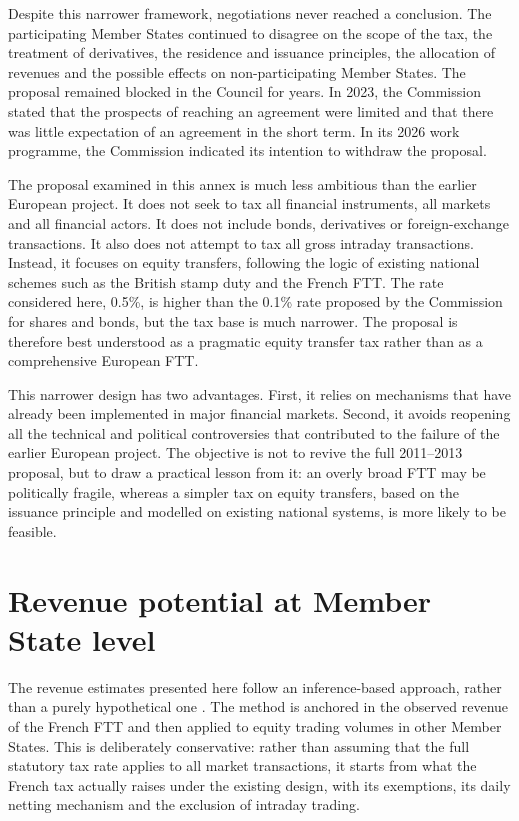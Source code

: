 \documentclass[../../main]{subfiles}
\begin{document}
Despite this narrower framework, negotiations never reached a conclusion. The participating Member States continued to disagree on the scope of the tax, the treatment of derivatives, the residence and issuance principles, the allocation of revenues and the possible effects on non-participating Member States. The proposal remained blocked in the Council for years. In 2023, the Commission stated that the prospects of reaching an agreement were limited and that there was little expectation of an agreement in the short term. In its 2026 work programme, the Commission indicated its intention to withdraw the proposal.

The proposal examined in this annex is much less ambitious than the earlier European project. It does not seek to tax all financial instruments, all markets and all financial actors. It does not include bonds, derivatives or foreign-exchange transactions. It also does not attempt to tax all gross intraday transactions. Instead, it focuses on equity transfers, following the logic of existing national schemes such as the British stamp duty and the French FTT. The rate considered here, 0.5\%, is higher than the 0.1\% rate proposed by the Commission for shares and bonds, but the tax base is much narrower. The proposal is therefore best understood as a pragmatic equity transfer tax rather than as a comprehensive European FTT.

This narrower design has two advantages. First, it relies on mechanisms that have already been implemented in major financial markets. Second, it avoids reopening all the technical and political controversies that contributed to the failure of the earlier European project. The objective is not to revive the full 2011--2013 proposal, but to draw a practical lesson from it: an overly broad FTT may be politically fragile, whereas a simpler tax on equity transfers, based on the issuance principle and modelled on existing national systems, is more likely to be feasible.

\section{Revenue potential at Member State level}

The revenue estimates presented here follow an inference-based approach, rather than a purely hypothetical one \citep{CapelleBlancardPersaud2025}. The method is anchored in the observed revenue of the French FTT and then applied to equity trading volumes in other Member States. This is deliberately conservative: rather than assuming that the full statutory tax rate applies to all market transactions, it starts from what the French tax actually raises under the existing design, with its exemptions, its daily netting mechanism and the exclusion of intraday trading.
\end{document}
